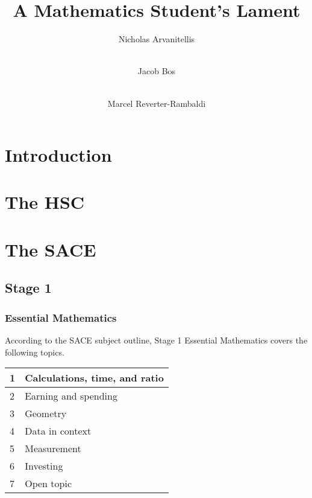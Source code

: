 \documentclass[12pt]{report}
\title{A Mathematics Student's Lament}
\author[1]{Nicholas Arvanitellis}
\author[2]{\\Jacob Bos}
\author[3]{\\Marcel Reverter-Rambaldi}
\affil[1,2,3]{Australian National University}
\affil[3]{The University of Queensland}
\begin{document}
    \maketitle
    \tableofcontents
\newpage


\chapter{Introduction}




\chapter{The HSC}




\chapter{The SACE}

\section{Stage 1}
\subsection{Essential Mathematics}

    According to the SACE subject outline, Stage 1 Essential Mathematics covers the following topics.
    \begin{table}[H]
        \centering
        \begin{tabular}{|l|l|}
        \hline
            1 & Calculations, time, and ratio \\ \hline
            2 & Earning and spending \\ \hline
            3 & Geometry \\ \hline
            4 & Data in context \\ \hline
            5 & Measurement \\ \hline
            6 & Investing \\ \hline
            7 & Open topic \\ \hline
        \end{tabular}
    \end{table}
\end{document}
